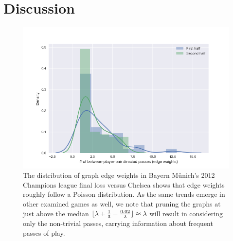 \documentclass[9pt,twocolumn,twoside]{pnas-report}
\DeclarePairedDelimiter\floor{\lfloor}{\rfloor}
\begin{document}
\section*{Discussion}


\begin{figure}[t]\centering
	\includegraphics[width=0.8\linewidth]{BayernPassWeightComparison.png}
	\caption{The distribution of graph edge weights in Bayern Münich's 2012 Champions league final loss versus Chelsea shows that edge weights roughly follow a Poisson distribution. As the same trends emerge in other examined games as well, we note that pruning the graphs at just above the median $\floor{\lambda + \frac{1}{3} - \frac{0.02}{\lambda}} \approx \lambda$ will result in considering only the non-trivial passes, carrying information about frequent passes of play.}
	\label{fig:BayernWeights}
\end{figure}
\end{document}

